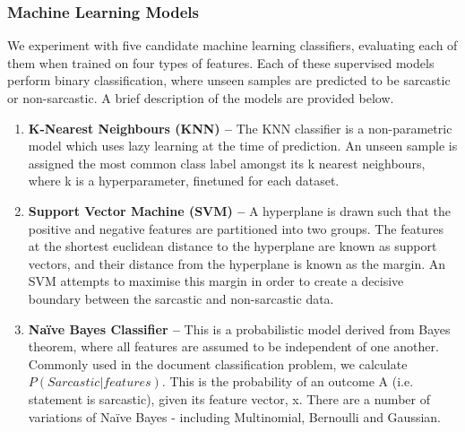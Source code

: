 \documentclass[12pt,a4paper]{article}
\begin{document}
\subsubsection{Machine Learning Models}
We experiment with five candidate machine learning classifiers, evaluating each of them when trained on four types of features. Each of these supervised models perform binary classification, where unseen samples are predicted to be sarcastic or non-sarcastic. A brief description of the models are provided below. 

\begin{enumerate}[leftmargin=0cm]
	\item \textbf{K-Nearest Neighbours (KNN) --} The KNN classifier is a non-parametric model which uses lazy learning at the time of prediction. An unseen sample is assigned the most common class label amongst its k nearest neighbours, where k is a hyperparameter, finetuned for each dataset.
	
	
	\item \textbf{Support Vector Machine (SVM) --} A hyperplane is drawn such that the positive and negative features are partitioned into two groups. The features at the shortest euclidean distance to the hyperplane are known as support vectors, and their distance from the hyperplane is known as the margin. An SVM attempts to maximise this margin in order to create a decisive boundary between the sarcastic and non-sarcastic data.
	
	\item \textbf{Na\"{i}ve Bayes Classifier --} This is a probabilistic model derived from Bayes theorem, where all features are assumed to be independent of one another. Commonly used in the document classification problem, we calculate ${P(Sarcastic | features)}$. This is  the probability of an outcome A (i.e. statement is sarcastic), given its feature vector, x. There are a number of variations of Na\"{i}ve Bayes - including Multinomial, Bernoulli and Gaussian. 


\end{enumerate}
\end{document}
